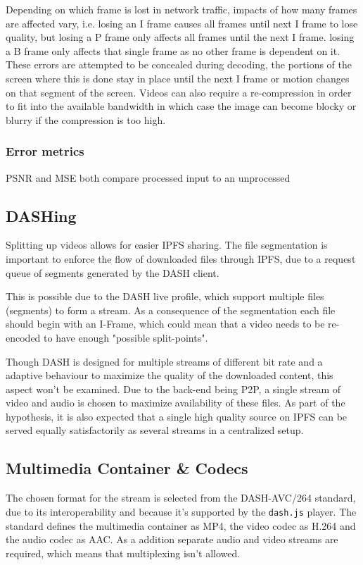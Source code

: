 Depending on which frame is lost in network traffic, impacts of how many frames are affected vary, i.e. losing an I frame causes all frames until next I frame to lose quality, but losing a P frame only affects all frames until the next I frame. losing a B frame only affects that single frame as no other frame is dependent on it.\\
These errors are attempted to be concealed during decoding, the portions of the screen where this is done stay in place until the next I frame or motion changes on that segment of the screen. Videos can also require a re-compression in order to fit into the available bandwidth in which case the image can become blocky or blurry if the compression is too high.

\subsubsection{Error metrics}
\ac{PSNR} and \ac{MSE} both compare processed input to an unprocessed

\subsection{DASHing}
Splitting up videos allows for easier \acs{IPFS} sharing. The file segmentation is important to enforce the flow of downloaded files through IPFS, due to a request queue of segments generated by the DASH client.

This is possible due to the DASH live profile, which support multiple files (segments) to form a stream. As a consequence of the segmentation each file should begin with an I-Frame, which could mean that a video needs to be re-encoded to have enough "possible split-points".

Though DASH is designed for multiple streams of different bit rate and a adaptive behaviour to maximize the quality of the downloaded content, this aspect won't be examined. Due to the back-end being \acs{P2P}, a single stream of video and audio is chosen to maximize availability of these files. As part of the hypothesis, it is also expected that a single high quality source on IPFS can be served equally satisfactorily as several streams in a centralized setup.

\subsection{Multimedia Container \& Codecs}
The chosen format for the stream is selected from the DASH-AVC/264 standard\cite{dash264}, due to its interoperability and because it's supported by the \texttt{dash.js} player.
The standard defines the multimedia container as MP4, the video codec as H.264 and the audio codec as AAC. As a addition separate audio and video streams are required, which means that multiplexing isn't allowed.



